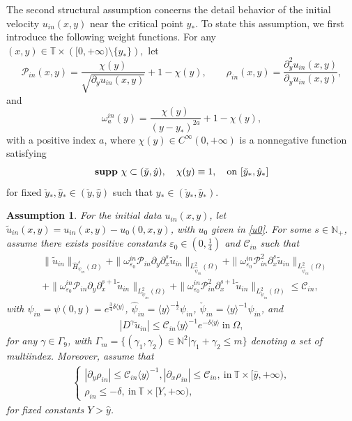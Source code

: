 \documentclass{amsart}
\numberwithin{equation}{section}
\newtheorem{assumption}{Assumption}[section]
\newcommand\y{{{\langle y \rangle}}}
\begin{document}
The second structural assumption concerns the detail behavior of the initial velocity $u_{in}(x,y)$ near the critical point $y_{*}$. To state this assumption, we first introduce the following weight functions.
For any $(x,y)\in\mathbb{T}\times\left([0,+\infty)\setminus\{y_{*}\}\right),$ let
$$\mathcal{P}_{in}(x,y)=\frac{\chi(y)}{\sqrt{\partial_{y}u_{in}(x,y)}}+1-\chi(y),
\qquad
\rho_{in}(x,y)=\frac{\partial_{y}^{2}u_{in}(x,y)}{\partial_{y}u_{in}(x,y)},$$
and
$$\omega_{a}^{in}(y)=\frac{\chi(y)}{(y-y_{*})^{2a}}+1-\chi(y),$$
with a positive index $a$, where $\chi(y)\in C^\infty(0,+\infty)$ is a nonnegative function satisfying
\begin{equation}\label{chi}
{\bf supp}~\chi\subset(\check{y},\hat{y}), \quad
\chi(y)\equiv 1, \quad {\rm on}~ [\check{y}_{*},\hat{y}_{*}]
\end{equation}
for fixed   $\check{y}_{*},\hat{y}_{*}\in(\check{y},\hat{y})$ such that $y_{*}\in(\check{y}_{*},\hat{y}_{*})$.





\begin{assumption}\label{inA}
For the initial data $u_{in}(x,y)$, let $\tilde{u}_{in}(x,y)=u_{in}(x,y)-u_{0}(0,x,y)$, with $u_0$ given in \eqref{u0}.
For some $s\in\mathbb{N}_{+}$, assume there exists positive constants $\varepsilon_{0}\in\left(0,\frac{1}{4}\right)$ and $\mathcal{C}_{in}$ such that
\begin{align}\label{inA4}
&\|\tilde{u}_{in}\|_{\hat{H}_{\psi_{in}}^{s}(\Omega)}
+\|\omega_{\varepsilon_{0}}^{in}\mathcal{P}_{in}\partial_{y}\partial_{x}^{s}\tilde{u}_{in}\|_{L_{\hat{\psi}_{in}}^{2}(\Omega)}
+\|\omega_{\varepsilon_{0}}^{in}\mathcal{P}_{in}^{2}\partial_{x}^{s}\tilde{u}_{in}\|_{L_{\hat{\psi}_{in}}^{2}(\Omega)}\\
&+\|\omega_{\varepsilon_{0}}^{in}\mathcal{P}_{in}\partial_{y}\partial_{x}^{s+1}\tilde{u}_{in}\|_{L_{\check{\psi}_{in}}^{2}(\Omega)}
+\|\omega_{\varepsilon_{0}}^{in}\mathcal{P}_{in}^{2}\partial_{x}^{s+1}\tilde{u}_{in}\|_{L_{\check{\psi}_{in}}^{2}(\Omega)}
\leq \mathcal{C}_{in},\nonumber
\end{align}
with $\psi_{in}=\psi(0,y)=e^{\frac{3}{4}\delta\y}$, $\hat{\psi}_{in}=\y^{-\frac{1}{2}} \psi_{in}$, $\check{\psi}_{in}=\y^{-1} \psi_{in}$,
and
\begin{align}\label{inA5}
|D^{\gamma}\tilde{u}_{in}|\leq \mathcal{C}_{in}\y^{-1}e^{-\delta\y}~\text{in}~\Omega,
\end{align}
for any $\gamma\in\Gamma_{9}$, with $\Gamma_{m}=\{(\gamma_{1},\gamma_{2})\in\mathbb{N}^{2}| \gamma_{1}+\gamma_{2}\leq m\}$  denoting a set of multiindex. Moreover, assume that
\begin{align}\label{inA6}
\begin{cases}
|\partial_{y}\rho_{in}|\leq \mathcal{C}_{in}\y^{-1}, |\partial_{x}\rho_{in}|\leq \mathcal{C}_{in},~\text{in}~\mathbb{T}\times[\hat{y},+\infty),\\
\rho_{in}\leq -\delta,~\text{in}~\mathbb{T}\times[Y,+\infty),
\end{cases}
\end{align}
for fixed constants $Y>\hat{y}$.


\end{assumption}
\end{document}
